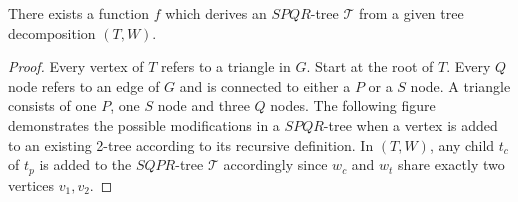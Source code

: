 \begin{lemma}
	There exists a function $f$ which derives an $SPQR$-tree $\mathcal{T}$ from a given tree decomposition $(T,W)$.
\end{lemma}
\begin{proof}
	Every vertex of $T$ refers to a triangle in $G$. Start at the root of $T$. Every $Q$ node refers to an edge of $G$ and is connected to either a $P$ or a $S$ node. A triangle consists of one $P$, one $S$ node and three $Q$ nodes. The following figure demonstrates the possible modifications in a $SPQR$-tree when a vertex is added to an existing 2-tree according to its recursive definition.
	In $(T,W)$, any child $t_c$ of $t_p$ is added to the $SQPR$-tree $\mathcal{T}$ accordingly since $w_c$ and $w_t$ share exactly two vertices $v_1,v_2$.
\end{proof}
